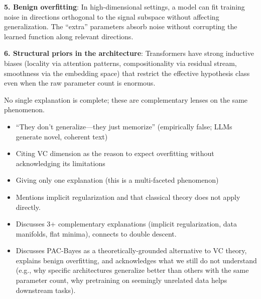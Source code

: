 \begin{interviewq}
\textbf{5. Benign overfitting}: In high-dimensional settings, a model can fit training noise in directions orthogonal to the signal subspace without affecting generalization. The ``extra'' parameters absorb noise without corrupting the learned function along relevant directions.

\textbf{6. Structural priors in the architecture}: Transformers have strong inductive biases (locality via attention patterns, compositionality via residual stream, smoothness via the embedding space) that restrict the effective hypothesis class even when the raw parameter count is enormous.

No single explanation is complete; these are complementary lenses on the same phenomenon.

\redflags
\begin{itemize}
    \item ``They don't generalize---they just memorize'' (empirically false; LLMs generate novel, coherent text)
    \item Citing VC dimension as the reason to expect overfitting without acknowledging its limitations
    \item Giving only one explanation (this is a multi-faceted phenomenon)
\end{itemize}


\goodgreat
\begin{itemize}
    \item {} Mentions implicit regularization and that classical theory does not apply directly.
    \item {} Discusses 3+ complementary explanations (implicit regularization, data manifolds, flat minima), connects to double descent.
    \item {} Discusses PAC-Bayes as a theoretically-grounded alternative to VC theory, explains benign overfitting, and acknowledges what we still do not understand (e.g., why specific architectures generalize better than others with the same parameter count, why pretraining on seemingly unrelated data helps downstream tasks).
\end{itemize}

\end{interviewq}
